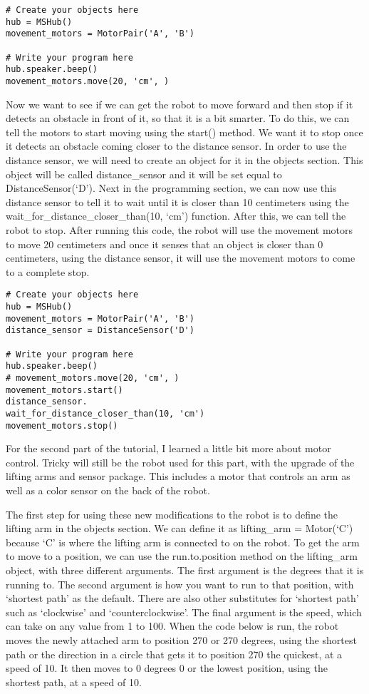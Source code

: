 \documentclass[10pt,twocolumn]{article}
\begin{document}
\begin{verbatim}
# Create your objects here
hub = MSHub()
movement_motors = MotorPair('A', 'B')
     
# Write your program here
hub.speaker.beep()
movement_motors.move(20, 'cm', )
\end{verbatim}
    
Now we want to see if we can get the robot to move forward and then stop if it detects an obstacle in front of it, so that it is a bit smarter. To do this, we can tell the motors to start moving using the start() method. We want it to stop once it detects an obstacle coming closer to the distance sensor. In order to use the distance sensor, we will need to create an object for it in the objects section. This object will be called distance\_sensor  and it will be set equal to DistanceSensor(‘D’). Next in the programming section, we can now use this distance sensor to tell it to wait until it is closer than 10 centimeters using the wait\_for\_distance\_closer\_than(10, ‘cm’) function. After this, we can tell the robot to stop. After running this code, the robot will use the movement motors to move 20 centimeters and once it senses that an object is closer than 0 centimeters, using the distance sensor, it will use the movement motors to come to a complete stop. 

\begin{verbatim}
# Create your objects here
hub = MSHub()
movement_motors = MotorPair('A', 'B')
distance_sensor = DistanceSensor('D')
 
# Write your program here
hub.speaker.beep()
# movement_motors.move(20, 'cm', )
movement_motors.start()
distance_sensor.
wait_for_distance_closer_than(10, 'cm')
movement_motors.stop()

\end{verbatim}

For the second part of the tutorial, I learned a little bit more about motor control. Tricky will still be the robot used for this part, with the upgrade of the lifting arms and sensor package. This includes a motor that controls an arm as well as a color sensor on the back of the robot. 

The first step for using these new modifications to the robot is to define the lifting arm in the objects section. We can define it as lifting\_arm = Motor(‘C’) because ‘C’ is where the lifting arm is connected to on the robot. To get the arm to move to a position, we can use the run.to.position method on the lifting\_arm object, with three different arguments. The first argument is the degrees that it is running to. The second argument is how you want to run to that position, with ‘shortest path’ as the default. There are also other substitutes for ‘shortest path’ such as ‘clockwise’ and ‘counterclockwise’. The final argument is the speed, which can take on any value from 1 to 100. When the code below is run, the robot moves the newly attached arm to position 270 or 270 degrees, using the shortest path or the direction in a circle that gets it to position 270 the quickest, at a speed of 10. It then moves to 0 degrees  0 or the lowest position, using the shortest path, at a speed of 10.  
\end{document}
